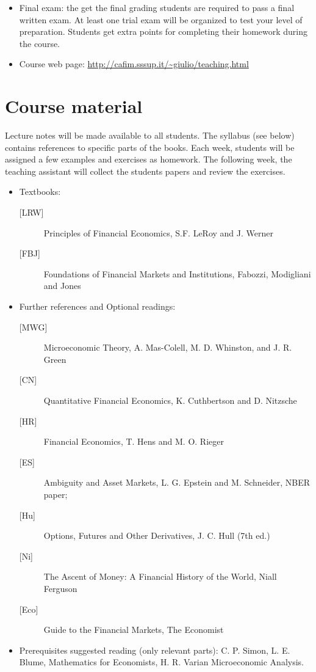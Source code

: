 \documentclass[11pt]{article}
\begin{document}
\begin{itemize}
\item Final exam: the get the final grading students are required to
pass a final written exam. At least one trial exam will be
organized to test your level of preparation. Students get extra
points for completing their homework during the course.

\item Course web page: \url{http://cafim.sssup.it/~giulio/teaching.html}
\end{itemize}
\section{Course material}
\label{sec-2}

Lecture notes will be made available to all students. The syllabus
(see below) contains references to specific parts of the books. Each
week, students will be assigned a few examples and exercises as
homework. The following week, the teaching assistant will collect
the students papers and review the exercises.

\begin{itemize}
\item Textbooks:
\begin{description}
\item[{[LRW]}] Principles of Financial Economics, S.F. LeRoy and
J. Werner
\item[{[FBJ]}] Foundations of Financial Markets and Institutions,
Fabozzi, Modigliani and Jones
\end{description}

\item Further references and Optional readings:
\begin{description}
\item[{[MWG]}] Microeconomic Theory, A. Mas-Colell, M. D. Whinston,
and J. R. Green
\item[{[CN]}] Quantitative Financial Economics, K. Cuthbertson and
D. Nitzsche
\item[{[HR]}] Financial Economics, T. Hens and M. O. Rieger
\item[{[ES]}] Ambiguity and Asset Markets, L. G. Epstein and
M. Schneider, NBER paper;
\item[{[Hu]}] Options, Futures and Other Derivatives, J. C. Hull (7th ed.)
\item[{[Ni]}] The Ascent of Money: A Financial History of the World,
Niall Ferguson
\item[{[Eco]}] Guide to the Financial Markets, The Economist
\end{description}

\item Prerequisites suggested reading (only relevant parts):
C. P. Simon, L. E. Blume, Mathematics for Economists, H. R. Varian
Microeconomic Analysis.
\end{itemize}
\end{document}
